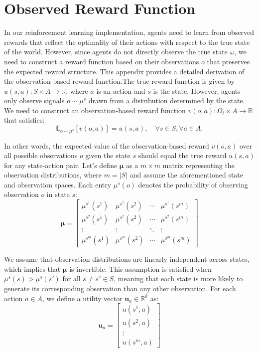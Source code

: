 \section{Observed Reward Function}
\label{appendix:observed_reward_derivation} In our reinforcement learning
implementation, agents need to learn from observed rewards that reflect the optimality
of their actions with respect to the true state of the world. However, since agents
do not directly observe the true state $\omega$, we need to construct a reward
function based on their observations $o$ that preserves the expected reward
structure. This appendix provides a detailed derivation of the observation-based
reward function.The true reward function is given by $u(s, a): S \times A \rightarrow
    \mathbb{R}$, where $a$ is an action and $s$ is the state. However, agents only
observe signals $o \sim \mu^{s}$ drawn from a distribution determined by the
state. We need to construct an observation-based reward function $v(o, a): \Omega
    _{i} \times A \rightarrow \mathbb{R}$ that satisfies:
\begin{equation}
    \mathbb{E}_{o \sim \mu^{s}}[v(o, a)] = u(s, a), \quad \forall s \in S, \forall
    a \in A.
\end{equation}

In other words, the expected value of the observation-based reward $v(o, a)$
over all possible observations $o$ given the state $s$ should equal the true
reward $u(s, a)$ for any state-action pair. Let's define $\bm{\mu}$ as a $m \times
    m$ matrix representing the observation distributions, where $m = |S|$ and assume
the aforementioned state and observation spaces. Each entry $\mu^{s}(o)$ denotes
the probability of observing observation $o$ in state $s$:
\begin{equation}
    \bm{\mu}=
    \begin{bmatrix}
        \mu^{s^1}(s^{1}) & \mu^{s^1}(s^{2}) & \cdots & \mu^{s^1}(s^{m}) \\
        \mu^{s^2}(s^{1}) & \mu^{s^2}(s^{2}) & \cdots & \mu^{s^2}(s^{m}) \\
        \vdots           & \vdots           & \ddots & \vdots           \\
        \mu^{s^m}(s^{1}) & \mu^{s^m}(s^{2}) & \cdots & \mu^{s^m}(s^{m})
    \end{bmatrix}
\end{equation}

We assume that observation distributions are linearly independent across states,
which implies that $\bm{\mu}$ is invertible. This assumption is satisfied when $\mu
    ^{s}(s) > \mu^{s}(s')$ for all $s \neq s' \in S$, meaning that each state is
more likely to generate its corresponding observation than any other observation.
For each action $a \in A$, we define a utility vector
$\bm{u}_{a} \in \mathbb{R}^{k}$ as:
\begin{equation}
    \bm{u}_{a} =
    \begin{bmatrix}
        u(s^{1}, a) \\
        u(s^{2}, a) \\
        \vdots      \\
        u(s^{m}, a)
    \end{bmatrix}
\end{equation}

